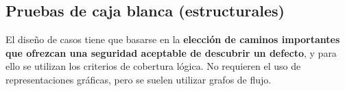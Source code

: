 




\subsection{Pruebas de caja blanca (estructurales)}
El diseño de casos tiene que basarse en la \textbf{elección de caminos importantes que ofrezcan una seguridad aceptable de descubrir un defecto}, y para ello se utilizan los criterios de cobertura lógica. No requieren el uso de representaciones gráficas, pero se suelen utilizar grafos de flujo.

